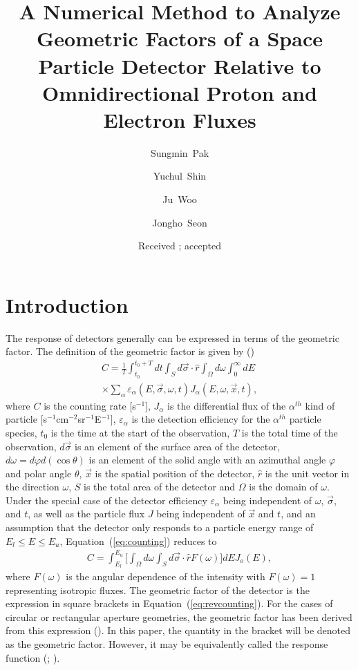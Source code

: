 \documentclass{jkas}
\date{Received \received; accepted \accepted}
\title{
A Numerical Method to Analyze Geometric Factors of a Space Particle Detector Relative to Omnidirectional Proton and Electron Fluxes
}
\author[]{Sungmin~Pak}
\author[]{Yuchul~Shin}
\author[]{Ju~Woo}
\author[]{Jongho~Seon}
\affil[]{School of Space Research, Kyung Hee University, Yongin, Gyeonggi 17104, Korea; \email{jhseon@khu.ac.kr}}
\begin{document}
\jkashead %


\section{Introduction\label{sec:intro}}

The response of detectors generally can be expressed in terms of the geometric factor. The definition of the geometric factor is given by (\citealt{sullivan1971})
%
\begin{eqnarray}
\label{eq:counting}
C = \frac{1}{T}\int_{t_0}^{t_0+T}dt\int_{S}d\vec\sigma\cdot\hat{r}\int_{\Omega}d\omega\int_{0}^{\infty}dE \nonumber\\ \times \sum_{\alpha}\varepsilon_{\alpha}(E,\vec\sigma,\omega,t)J_{\alpha}(E,\omega,\vec x,t),
\end{eqnarray}
%
where $C$ is the counting rate [s$^{-1}$], $J_{\alpha}$ is the differential flux of the $\alpha^{th}$ kind of particle [s$^{-1}$cm$^{-2}$sr$^{-1}$E$^{-1}]$, $\varepsilon_{\alpha}$ is the detection efficiency for the $\alpha^{th}$ particle species, $t_{0}$ is the time at the start of the observation, $T$ is the total time of the observation, $d\vec\sigma$ is an element of the surface area of the detector, $d\omega = d\varphi d(\cos\theta)$ is an element of the solid angle with an azimuthal angle $\varphi$ and polar angle $\theta$, $\vec x$ is the spatial position of the detector, $\hat r$ is the unit vector in the direction $\omega$, $S$ is the total area of the detector and $\Omega$ is the domain of $\omega$. Under the special case of the detector efficiency $\varepsilon_{\alpha}$ being independent of $\omega$, $\vec\sigma$, and $t$, as well as the particle flux $J$ being independent of $\vec x$ and $t$, and an assumption that the detector only responds to a particle energy range of $E_{l}\le E\le E_{u}$, Equation~(\ref{eq:counting}) reduces to
%
\begin{eqnarray}
\label{eq:revcounting}
C = \int_{E_l}^{E_u}\biggr[\int_{\Omega}d\omega\int_{S}d\vec\sigma\cdot\hat r F(\omega)\biggr]dEJ_o (E),
\end{eqnarray}
%
where $F(\omega)$ is the angular dependence of the intensity with $F(\omega)=1$ representing isotropic fluxes. The geometric factor of the detector is the expression in square brackets in Equation~(\ref{eq:revcounting}). For the cases of circular or rectangular aperture geometries, the geometric factor has been derived from this expression (\citealt{thomas1972}). In this paper, the quantity in the bracket will be denoted as the geometric factor. However, it may be equivalently called the response function (\citealt{sullivan1971}; \citealt{thomas1972}).
\end{document}
